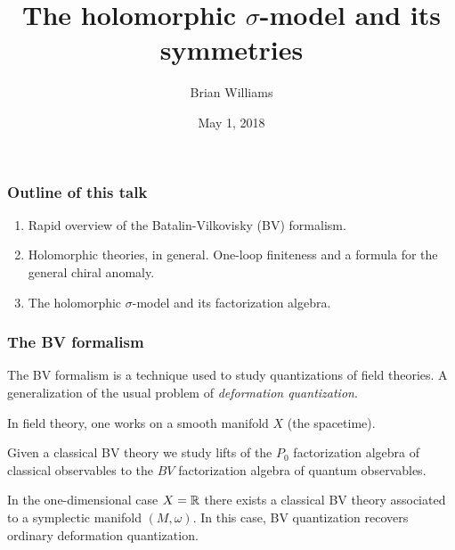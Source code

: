 \documentclass[10pt]{beamer}
\title{The holomorphic $\sigma$-model and its symmetries}
\author{Brian Williams}
\institute{Northwestern University \\ Advisors: John Francis and Kevin Costello}
\date{May 1, 2018}
\begin{document}
\frame{\titlepage}

\begin{frame}
\frametitle{Outline of this talk}
\begin{enumerate}
\item Rapid overview of the Batalin-Vilkovisky (BV) formalism.
\item Holomorphic theories, in general. 
One-loop finiteness and a formula for the general chiral anomaly. 
\item The holomorphic $\sigma$-model and its factorization algebra.
\end{enumerate}
\end{frame}

\begin{frame}[fragile]
\frametitle{The BV formalism}
The BV formalism is a technique used to study quantizations of field theories.
A generalization of the usual problem of {\em deformation quantization}.
\ben
{}
\een

In field theory, one works on a smooth manifold $X$ (the spacetime). 
\ben
{}
\een
Given a classical BV theory we study lifts of the $P_0$ factorization algebra of classical observables to the $BV$ factorization algebra of quantum observables.

In the one-dimensional case $X = \mathbb R$ there exists a classical BV theory associated to a symplectic manifold $(M, \omega)$. 
In this case, BV quantization recovers ordinary deformation quantization. 
\end{frame}
\end{document}
